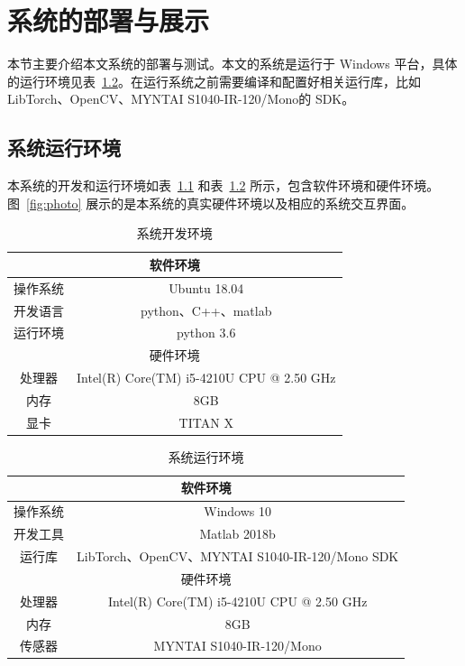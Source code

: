 
\chapter{系统的部署与展示}\label{figures_tables}
本节主要介绍本文系统的部署与测试。本文的系统是运行于 Windows 平台，具体的运行环境见表~\ref{tab:env2}。在运行系统之前需要编译和配置好相关运行库，比如 LibTorch、OpenCV、MYNTAI S1040-IR-120/Mono的 SDK。

\section{系统运行环境}
本系统的开发和运行环境如表~\ref{tab:env1} 和表~\ref{tab:env2} 所示，包含软件环境和硬件环境。图~\ref{fig:photo} 展示的是本系统的真实硬件环境以及相应的系统交互界面。
\begin{table}[thbp]
	\centering
	\small{}\setlength{}
	\caption{系统开发环境}
	\begin{tabular}{|c|c|}
		\hline
		\multicolumn{2}{|c|}{软件环境}                \\
		\hline
		操作系统   & Ubuntu 18.04 \\
		\hline
		开发语言   & python、C++、matlab \\
		\hline
		运行环境  & python 3.6    \\
		\hline
		\multicolumn{2}{|c|}{硬件环境} \\
		\hline
		处理器    &      Intel(R) Core(TM) i5-4210U CPU @ 2.50 GHz  \\
		\hline
		内存      &       8GB         \\
		\hline
		显卡    &     TITAN X       \\
		\hline
	\end{tabular}
	\label{tab:env1}
\end{table}

\begin{table}[thbp]
  \centering
  \small{}\setlength{}
  \caption{系统运行环境}
  \begin{tabular}{|c|c|}
    \hline
    \multicolumn{2}{|c|}{软件环境}                \\
    \hline
    操作系统   & Windows 10 					  \\
    \hline
    开发工具  & Matlab 2018b  					   \\
    \hline
    运行库   & LibTorch、OpenCV、MYNTAI S1040-IR-120/Mono SDK \\
    \hline
    \multicolumn{2}{|c|}{硬件环境} \\
    \hline
    处理器    &      Intel(R) Core(TM) i5-4210U CPU @ 2.50 GHz  \\
    \hline
    内存      &       8GB         \\
    \hline
    传感器    &     MYNTAI S1040-IR-120/Mono          \\
    \hline
  \end{tabular}
  \label{tab:env2}
\end{table}

